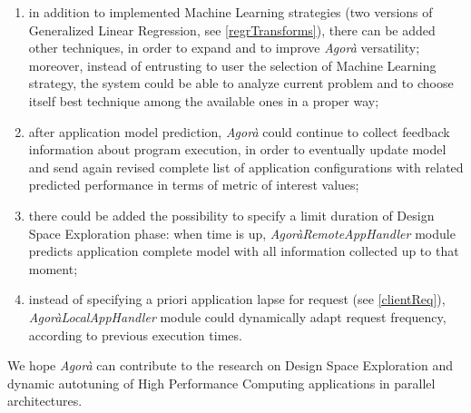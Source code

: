 \begin{enumerate}

	\item in addition to implemented Machine Learning strategies (two versions of Generalized Linear Regression, see \ref{regrTransforms}), there can be added other techniques, in order to expand and to improve \textit{Agorà} versatility; moreover, instead of entrusting to user the selection of Machine Learning strategy, the system could be able to analyze current problem and to choose itself best technique among the available ones in a proper way;

	\item after application model prediction, \textit{Agorà} could continue to collect feedback information about program execution, in order to eventually update model and send again revised complete list of application configurations with related predicted performance in terms of metric of interest values;

	\item there could be added the possibility to specify a limit duration of Design Space Exploration phase: when time is up, \textit{AgoràRemoteAppHandler} module predicts application complete model with all information collected up to that moment;

	\item instead of specifying a priori application lapse for request (see \ref{clientReq}), \textit{AgoràLocalAppHandler} module could dynamically a\-dapt request frequency, according to previous execution times.

\end{enumerate}

We hope \textit{Agorà} can contribute to the research on Design Space Exploration and dynamic autotuning of High Performance Computing applications in parallel architectures.
